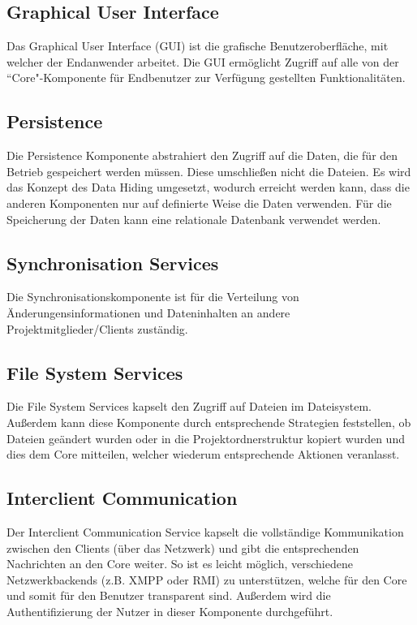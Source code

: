 \subsection{Graphical User Interface}
Das Graphical User Interface (GUI) ist die grafische Benutzeroberfläche, mit welcher der Endanwender arbeitet.
Die GUI ermöglicht Zugriff auf alle von der ``Core"-Komponente für Endbenutzer zur Verfügung gestellten
Funktionalitäten.

\subsection{Persistence} 
Die Persistence Komponente abstrahiert den Zugriff auf die Daten, die für den Betrieb gespeichert werden müssen. Diese umschließen nicht die Dateien. Es wird das Konzept des Data Hiding umgesetzt, wodurch erreicht werden kann, dass die anderen Komponenten nur auf definierte Weise die Daten verwenden. Für die Speicherung der Daten kann eine relationale Datenbank verwendet werden.

\subsection{Synchronisation Services}
Die Synchronisationskomponente ist für die Verteilung von Änderungensinformationen und Dateninhalten an andere
Projektmitglieder/Clients zuständig. 

\subsection{File System Services}
Die File System Services kapselt den Zugriff auf Dateien im Dateisystem. Außerdem kann diese Komponente durch
entsprechende Strategien feststellen, ob Dateien geändert wurden oder in die Projektordnerstruktur kopiert wurden und dies dem Core mitteilen, welcher wiederum entsprechende Aktionen veranlasst.

\subsection{Interclient Communication} 
Der Interclient Communication Service kapselt die vollständige Kommunikation zwischen den Clients (über das Netzwerk) und gibt die entsprechenden Nachrichten an den Core weiter. So ist es leicht möglich, verschiedene Netzwerkbackends (z.B. XMPP oder RMI) zu unterstützen, welche für den Core und somit für den Benutzer transparent sind. Außerdem wird die Authentifizierung der
Nutzer in dieser Komponente durchgeführt. 


